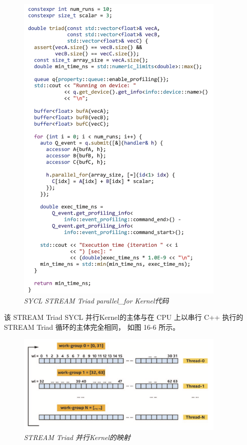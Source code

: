 \begin{figure}[H]
	\centering
	\includegraphics[width=0.9\textwidth]{figs/F16.6.png}
	\caption{\textit{SYCL STREAM Triad parallel\_for Kernel代码 }}
\end{figure}

该 STREAM Triad SYCL 并行Kernel的主体与在 CPU 上以串行 C++ 执行的 STREAM Triad 循环的主体完全相同，
如图 16-6 所示。

\begin{figure}[H]
	\centering
	\includegraphics[width=0.9\textwidth]{figs/F16.7.png}
	\caption{\textit{STREAM Triad 并行Kernel的映射 }}
\end{figure}

